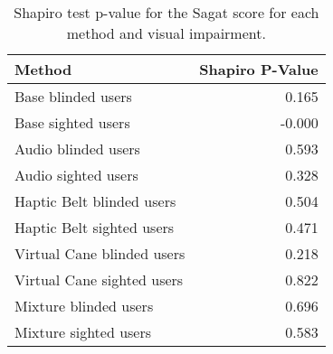 
\begin{table}[!htb]
\centering
\caption{Shapiro test p-value for the Sagat score for each method and visual impairment.}
\label{tab:shapiro_sagat_score}
\begin{tabular}{lr}
\toprule
                    Method &  Shapiro P-Value \\
\midrule
        Base blinded users &            0.165 \\
        Base sighted users &           -0.000 \\
       Audio blinded users &            0.593 \\
       Audio sighted users &            0.328 \\
 Haptic Belt blinded users &            0.504 \\
 Haptic Belt sighted users &            0.471 \\
Virtual Cane blinded users &            0.218 \\
Virtual Cane sighted users &            0.822 \\
     Mixture blinded users &            0.696 \\
     Mixture sighted users &            0.583 \\
\bottomrule
\end{tabular}
\end{table}

